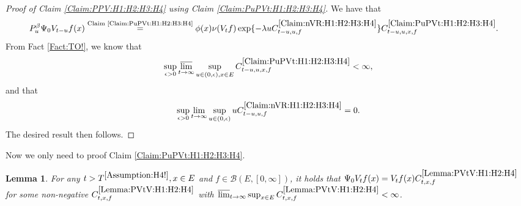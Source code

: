 \documentclass[12pt,a4paper]{amsart}
\numberwithin{equation}{section}
\theoremstyle{plain}
\newtheorem{lem}[thm]{Lemma}
\theoremstyle{definition}
\theoremstyle{remark}
\newcounter{N}
\newcounter{n}[N]
\begin{document}
\begin{proof}[{Proof of Claim \ref{Claim:PPV:H1:H2:H3:H4} using Claim \ref{Claim:PuPVt:H1:H2:H3:H4}}]
We have that
\begin{align}
 & P_u^\beta \Psi_0 V_{t-u} f(x) 
 \overset{\text{Claim \ref{Claim:PuPVt:H1:H2:H3:H4}}}= \phi(x) \nu(V_{t}f) \exp\{-\lambda u C^{\ref{Claim:nVR:H1:H2:H3:H4}}_{t-u,u,f} \} C^{\ref{Claim:PuPVt:H1:H2:H3:H4}}_{t-u,u,x,f}.
 \end{align}
From Fact \ref{Fact:TO!}, we know that 
\[\sup_{\epsilon > 0}\varlimsup_{t\to \infty} \sup_{u\in (0,\epsilon), x\in E} C^{\ref{Claim:PuPVt:H1:H2:H3:H4}}_{t-u,u,x,f} < \infty,\] 
and that 
\[\sup_{\epsilon > 0}\lim_{t\to \infty} \sup_{u\in (0,\epsilon)} uC^{\ref{Claim:nVR:H1:H2:H3:H4}}_{t-u,u,f} =0.\]
The desired result then follows.
\end{proof}
Now we only need to proof Claim \ref{Claim:PuPVt:H1:H2:H3:H4}.
\begin{lem} \label{Lemma:PVtV:H1:H2:H4} 
For any $t> T^{\ref{Assumption:H4!}}, x\in E$ and $f\in \mathcal B(E,[0,\infty])$, it holds that
$
 \Psi_0 V_t f(x) 
 = V_tf(x) C^{\ref{Lemma:PVtV:H1:H2:H4}}_{t,x,f}
$
 for some non-negative $C^{\ref{Lemma:PVtV:H1:H2:H4}}_{t,x,f}$ with $\varlimsup_{t\to \infty} \sup_{x\in E}C^{\ref{Lemma:PVtV:H1:H2:H4}}_{t,x,f} < \infty$.
\end{lem}
\end{document}
